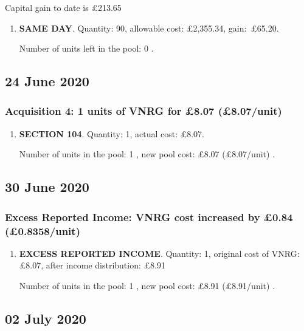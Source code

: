 \documentclass{article}
\begin{document}
Capital gain to date is £213.65

\begin{enumerate}
\item \textbf{SAME DAY}. Quantity: 90,
    allowable
    cost:
    £2,355.34,
    \mbox{gain: £65.20.}

    Number of units left in the pool:
    0%
.

\end{enumerate}



\subsection*{24 June 2020}
\subsubsection*{
    Acquisition 4: 1 units of VNRG for £8.07
    (£8.07/unit)%
}

\begin{enumerate}
\item \textbf{SECTION 104}. Quantity: 1,
    actual cost: £8.07.

    Number of units in the pool:
    1%
,
    new pool cost: £8.07
    (£8.07/unit)%
.

\end{enumerate}



\subsection*{30 June 2020}
\subsubsection*{
    Excess Reported Income: VNRG cost increased by £0.84
    (£0.8358/unit)%
}

\begin{enumerate}
\item \textbf{EXCESS REPORTED INCOME}. Quantity: 1,
    original cost of VNRG: £8.07, after income distribution: £8.91%

    Number of units in the pool:
    1%
,
    new pool cost: £8.91
    (£8.91/unit)%
.

\end{enumerate}



\subsection*{02 July 2020}
\end{document}
